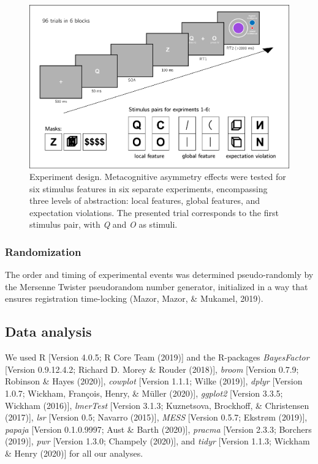 \documentclass[12pt,twoside]{reedthesis}
\begin{document}
\begin{figure}
\includegraphics[width=1\linewidth]{figure/asymmetry/trial_structure} \caption[Design for Experiments 1-6]{Experiment design. Metacognitive asymmetry effects were tested for six stimulus features in six separate experiments, encompassing three levels of abstraction: local features, global features, and expectation violations. The presented trial corresponds to the first stimulus pair, with \emph{Q} and \emph{O} as stimuli.}\label{fig:asymmetry-trialstructure}
\end{figure}
\hypertarget{randomization-3}{%
\subsubsection{Randomization}\label{randomization-3}}

The order and timing of experimental events was determined pseudo-randomly by the Mersenne Twister pseudorandom number generator, initialized in a way that ensures registration time-locking (Mazor, Mazor, \& Mukamel, 2019).

\hypertarget{data-analysis-1}{%
\subsection{Data analysis}\label{data-analysis-1}}

We used R {[}Version 4.0.5; R Core Team (2019){]} and the R-packages \emph{BayesFactor} {[}Version 0.9.12.4.2; Richard D. Morey \& Rouder (2018){]}, \emph{broom} {[}Version 0.7.9; Robinson \& Hayes (2020){]}, \emph{cowplot} {[}Version 1.1.1; Wilke (2019){]}, \emph{dplyr} {[}Version 1.0.7; Wickham, François, Henry, \& Müller (2020){]}, \emph{ggplot2} {[}Version 3.3.5; Wickham (2016){]}, \emph{lmerTest} {[}Version 3.1.3; Kuznetsova, Brockhoff, \& Christensen (2017){]}, \emph{lsr} {[}Version 0.5; Navarro (2015){]}, \emph{MESS} {[}Version 0.5.7; Ekstrøm (2019){]}, \emph{papaja} {[}Version 0.1.0.9997; Aust \& Barth (2020){]}, \emph{pracma} {[}Version 2.3.3; Borchers (2019){]}, \emph{pwr} {[}Version 1.3.0; Champely (2020){]}, and \emph{tidyr} {[}Version 1.1.3; Wickham \& Henry (2020){]} for all our analyses.
\end{document}
